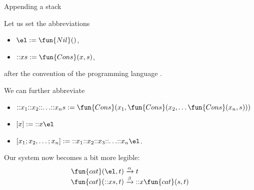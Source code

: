 %
\begin{frame}{Appending a stack}

  Let us set the abbreviations
  \begin{itemize}

    \item \(\el := \fun{Nil}()\),

    \item \(\cons{x}{s} := \fun{Cons}(x,s)\),

  \end{itemize}
  after the convention of the programming language \OCaml.

  \bigskip

  We can further abbreviate
  \begin{itemize}

    \item \(\cons{x_1}{\cons{x_2}{\cons{\dots}{\cons{x_n}{s}}}} :=
      \fun{Cons}(x_1, \fun{Cons}(x_2, \dots \fun{Cons}(x_n,s)))\)

    \item \([x] := \cons{x}{\el}\)

    \item \([x_1; x_2, \dots; x_n] :=
          \cons{x_1}{\cons{x_2}{\cons{x_3}{\cons{\ldots}{\cons{x_n}{\el}}}}}\).

  \end{itemize}

  Our system now becomes a bit more legible:
  \begin{align*}
    \fun{cat}(        \el,t) &\xrightarrow{\alpha} t\\
    \fun{cat}(\cons{x}{s},t) &\xrightarrow{\smash{\beta}}
    \cons{x}{\fun{cat}(s,t)}
  \end{align*}

\end{frame}

